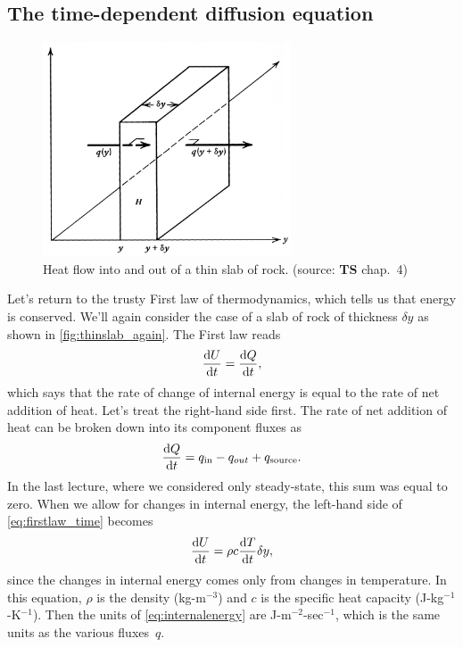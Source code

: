 \documentclass[11pt,twoside,a4paper]{article}
\begin{document}
\subsection{The time-dependent diffusion equation}

\begin{figure}[ht]
  \centering
  \includegraphics[height=2.5in]{../figs/L17/heatsourceslab}
  \caption{Heat flow into and out of a thin slab of rock. (source:
    \textbf{TS} chap.~4)}
  \label{fig:thinslab_again}
\end{figure}

Let's return to the trusty First law of thermodynamics, which tells us
that energy is conserved.  We'll again consider the case of a slab of
rock of thickness $\delta y$ as shown in \autoref{fig:thinslab_again}.
The First law reads
\begin{equation}
  \label{eq:firstlaw_time}
  \frac{\textrm{d} U}{\textrm{d} t} = \frac{\textrm{d} Q}{\textrm{d} t},
\end{equation}
which says that the rate of change of internal energy is equal to the
rate of net addition of heat.  Let's treat the right-hand side first.
The rate of net addition of heat can be broken down into its component
fluxes as
\begin{equation}
  \label{eq:heatfluxes}
  \frac{\textrm{d} Q}{\textrm{d} t} = q_\text{in} - q_{out} + q_\text{source}.
\end{equation}
In the last lecture, where we considered only steady-state, this sum
was equal to zero.  When we allow for changes in internal energy, the
left-hand side of \autoref{eq:firstlaw_time} becomes
\begin{equation}
  \label{eq:internalenergy}
  \frac{\textrm{d} U}{\textrm{d} t} = \rho c \frac{\textrm{d} T}{\textrm{d} t}\delta y,
\end{equation}
since the changes in internal energy comes only from changes in
temperature.  In this equation, $\rho$ is the density (kg-m$^{-3}$)
and $c$ is the specific heat capacity (J-kg$^{-1}$-K$^{-1}$).  Then
the units of \autoref{eq:internalenergy} are J-m$^{-2}$-sec$^{-1}$,
which is the same units as the various fluxes~$q$.
\end{document}

